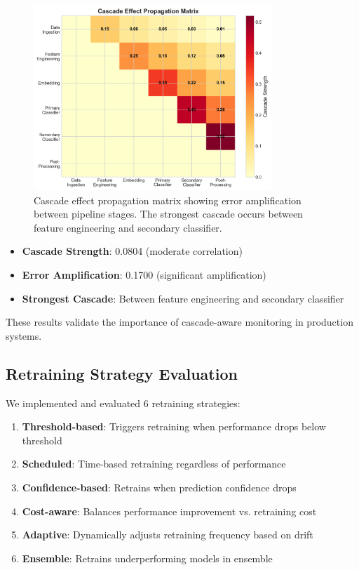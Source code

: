 \documentclass{article}
\begin{document}
\begin{figure}[h]
\centering
\includegraphics[width=0.8\textwidth]{media/cascade_heatmap.png}
\caption{Cascade effect propagation matrix showing error amplification between pipeline stages. The strongest cascade occurs between feature engineering and secondary classifier.}
\label{fig:cascade_heatmap}
\end{figure}

\begin{itemize}
    \item \textbf{Cascade Strength}: 0.0804 (moderate correlation)
    \item \textbf{Error Amplification}: 0.1700 (significant amplification)
    \item \textbf{Strongest Cascade}: Between feature engineering and secondary classifier
\end{itemize}

These results validate the importance of cascade-aware monitoring in production systems.

\subsection{Retraining Strategy Evaluation}

We implemented and evaluated 6 retraining strategies:

\begin{enumerate}
    \item \textbf{Threshold-based}: Triggers retraining when performance drops below threshold
    \item \textbf{Scheduled}: Time-based retraining regardless of performance
    \item \textbf{Confidence-based}: Retrains when prediction confidence drops
    \item \textbf{Cost-aware}: Balances performance improvement vs. retraining cost
    \item \textbf{Adaptive}: Dynamically adjusts retraining frequency based on drift
    \item \textbf{Ensemble}: Retrains underperforming models in ensemble
\end{enumerate}
\end{document}
